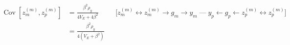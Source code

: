 \begin{align*}
  \operatorname{Cov}\left[z^{(m)}_{m}, z^{(m)}_{p}\right]
  &= \frac{\beta^{2} \rho_{y}}{4 V_{E} + 4 \beta^{2}} && \text{[}z^{(m)}_{m} \leftrightarrow z^{(m)}_{m} \rightarrow g_m \rightarrow y_m \;\text{---}\; y_p \leftarrow g_p \leftarrow z^{(m)}_{p} \leftrightarrow z^{(m)}_{p}\text{]} \\
  &= \frac{\beta^{2} \rho_{y}}{4 \left(V_{E} + \beta^{2}\right)}
\end{align*}